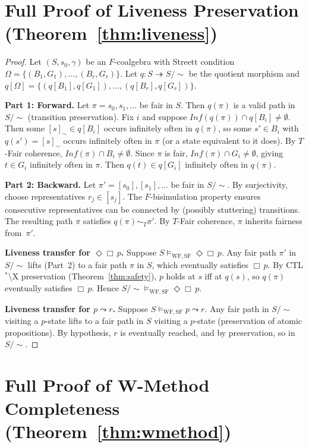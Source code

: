 \documentclass[11pt]{article}
\newcommand{\WF}{\ensuremath{\mathrm{WF}}}
\newcommand{\SF}{\ensuremath{\mathrm{SF}}}
\newcommand{\TFair}{$T$-Fair}
\begin{document}
\section{Full Proof of Liveness Preservation (Theorem~\ref{thm:liveness})}
\label{app:liveness-proof}

\begin{proof}
Let $(S, s_0, \gamma)$ be an $F$-coalgebra with Streett condition
$\Omega = \{(B_1, G_1), \ldots, (B_r, G_r)\}$.
Let $q : S \twoheadrightarrow S/{\sim}$ be the quotient morphism and
$q[\Omega] = \{(q[B_1], q[G_1]), \ldots, (q[B_r], q[G_r])\}$.

\textbf{Part 1: Forward.}
Let $\pi = s_0, s_1, \ldots$ be fair in $S$.
Then $q(\pi)$ is a valid path in $S/{\sim}$ (transition preservation).
Fix $i$ and suppose $\mathit{Inf}(q(\pi)) \cap q[B_i] \neq \emptyset$.
Then some $[s]_\sim \in q[B_i]$ occurs infinitely often in $q(\pi)$,
so some $s' \in B_i$ with $q(s') = [s]_\sim$ occurs infinitely often
in $\pi$ (or a state equivalent to it does).
By \TFair{} coherence, $\mathit{Inf}(\pi) \cap B_i \neq \emptyset$.
Since $\pi$ is fair, $\mathit{Inf}(\pi) \cap G_i \neq \emptyset$, giving
$t \in G_i$ infinitely often in $\pi$.
Then $q(t) \in q[G_i]$ infinitely often in $q(\pi)$.

\textbf{Part 2: Backward.}
Let $\pi' = [s_0], [s_1], \ldots$ be fair in $S/{\sim}$.
By surjectivity, choose representatives $r_j \in [s_j]$.
The $F$-bisimulation property ensures consecutive representatives can be
connected by (possibly stuttering) transitions.
The resulting path $\pi$ satisfies $q(\pi) \sim_T \pi'$.
By \TFair{} coherence, $\pi$ inherits fairness from~$\pi'$.

\textbf{Liveness transfer for $\Diamond\Box\,p$.}
Suppose $S \models_{\WF,\SF} \Diamond\Box\,p$.
Any fair path $\pi'$ in $S/{\sim}$ lifts (Part~2) to a fair path $\pi$
in $S$, which eventually satisfies $\Box\,p$.
By CTL$^*$$\setminus$X preservation (Theorem~\ref{thm:safety}), $p$ holds
at $s$ iff at $q(s)$, so $q(\pi)$ eventually satisfies $\Box\,p$.
Hence $S/{\sim} \models_{\WF,\SF} \Diamond\Box\,p$.

\textbf{Liveness transfer for $p \leadsto r$.}
Suppose $S \models_{\WF,\SF} p \leadsto r$.
Any fair path in $S/{\sim}$ visiting a $p$-state lifts to a fair path
in $S$ visiting a $p$-state (preservation of atomic propositions).
By hypothesis, $r$ is eventually reached, and by preservation, so in
$S/{\sim}$.
\end{proof}


\section{Full Proof of W-Method Completeness (Theorem~\ref{thm:wmethod})}
\label{app:wmethod-proof}
\end{document}
